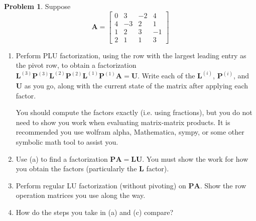 \documentclass[12pt]{article}
\theoremstyle{definition}
\newtheorem{problem}{Problem}
\renewcommand{\vec}{\mathbf}
\begin{document}
\begin{problem}
Suppose
    \[
        \vec{A} 
        = 
        \begin{bmatrix}
            0 & 3 & -2 & 4 \\
            4 & -3 & 2 & 1 \\
            1 & 2 & 3 & -1 \\
            2 & 1 & 1& 3
        \end{bmatrix}
    \]

    \begin{enumerate}
        \item Perform PLU factorization, using the row with the largest leading entry as the pivot row, to obtain a factorization $\vec{L}^{(3)} \vec{P}^{(3)} \vec{L}^{(2)} \vec{P}^{(2)} \vec{L}^{(1)} \vec{P}^{(1)} \vec{A} = \vec{U}$.
        Write each of the $\vec{L}^{(i)}$, $\vec{P}^{(i)}$, and $\vec{U}$ as you go, along with the current state of the matrix after applying each factor.
            
            You should compute the factors exactly (i.e. using fractions), but you do not need to show you work when evaluating matrix-matrix products. It is recommended you use wolfram alpha, Mathematica, sympy, or some other symbolic math tool to assist you.  

        \item Use (a) to find a factorization $\vec{P}\vec{A}  = \vec{L} \vec{U}$.
        You must show the work for how you obtain the factors (particularly the $\vec{L}$ factor).
        \item Perform regular LU factorization (without pivoting) on $\vec{P}\vec{A}$.
            Show the row operation matrices you use along the way.
        \item How do the steps you take in (a) and (c) compare?
    \end{enumerate}
\end{problem}
\end{document}
